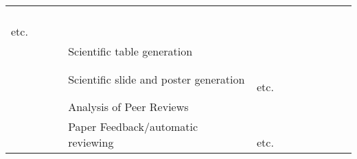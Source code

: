 \begin{table}[]
{\begin{tabular}{p{2.5cm}|p{3.5cm}|p{4.5cm}|p{6cm}}
                            ~\cite{petrak-etal-2023-arithmetic}
                            ~\cite{korkmaz-del-rio-chanona-2024-integrating}
                            etc.       \\ \cline{3-4}
\cellcolor{layer-2!15} & \raisebox{0.2cm}{\small \textbf{understanding (\$\ref{sec:multimodal})}} &    \small   Scientific table generation
                    & \small 
                            ~\cite{sundar2024gtbls}
                            ~\cite{ZHAO2024586}
                            ~\cite{10448427}
                            ~\cite{ramu-etal-2024-bad}     \\ \cline{3-4}
\cellcolor{layer-2!15} &&    \small  Scientific slide and poster generation
                    & \small 
                            ~\cite{Sravanthi2009SlidesGenAG}
                            ~\cite{Hu2013PPSGenLT}
                            ~\cite{Wang2017PhraseBasedPS}
                            ~\cite{Li2021TowardsTS}
                            ~\cite{Fu2021DOC2PPTAP}
                            ~\cite{sun-etal-2021-d2s}
                            ~\cite{mondal-etal-2024-presentations}
                            ~\cite{maheshwari-etal-2024-presentations}
                            etc.      \\ \cline{2-4}
\cellcolor{layer-2!15} & \small \multirow{10}{*}{{\textbf{Peer review (\$\ref{sec:peer_review})}}}
&    \small Analysis of Peer Reviews
                    & \small 
                            ~\cite{10.1145/3529372.3533300}
                            ~\cite{politepeer}
                            ~\cite{Chakraborty_2020}
                            ~\cite{Fromm2021}
                            ~\cite{hua-etal-2019-argument}
                            ~\cite{guo-etal-2023-automatic}
                            ~\cite{cheng-etal-2020-ape}
                            ~\cite{purkayastha-etal-2023-exploring}       \\ \cline{3-4}
\cellcolor{layer-2!15} &&  \small    Paper Feedback/automatic reviewing
                    & \small 
                            ~\cite{nguyen-litman-2014-improving}
                            ~\cite{su-etal-2023-reviewriter}
                            ~\cite{bjet}
                            ~\cite{li-etal-2020-multi-task}
                            ~\cite{ghosal-etal-2019-deepsentipeer}
                            ~\cite{10.1007/978-3-030-91669-5_33}
                            ~\cite{wang-etal-2020-reviewrobot}
                            ~\cite{bartoli2020}
                            etc.      \\ \cline{3-4}

\end{tabular}}
\end{table}

